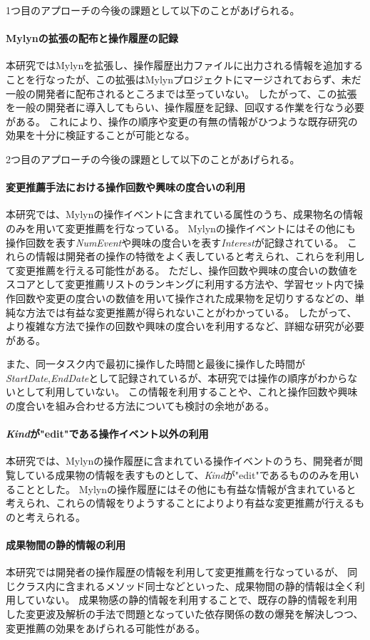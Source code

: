 \documentclass[a4paper]{jsbook}
\begin{document}
1つ目のアプローチの今後の課題として以下のことがあげられる。
\paragraph{Mylynの拡張の配布と操作履歴の記録}
本研究ではMylynを拡張し、操作履歴出力ファイルに出力される情報を追加することを行なったが、この拡張はMylynプロジェクトにマージされておらず、未だ一般の開発者に配布されるところまでは至っていない。
したがって、この拡張を一般の開発者に導入してもらい、操作履歴を記録、回収する作業を行なう必要がある。
これにより、操作の順序や変更の有無の情報がひつような既存研究の効果を十分に検証することが可能となる。

2つ目のアプローチの今後の課題として以下のことがあげられる。
\paragraph{変更推薦手法における操作回数や興味の度合いの利用}
本研究では、Mylynの操作イベントに含まれている属性のうち、成果物名の情報のみを用いて変更推薦を行なっている。
Mylynの操作イベントにはその他にも操作回数を表す{\it NumEvent}や興味の度合いを表す{\it Interest}が記録されている。
これらの情報は開発者の操作の特徴をよく表していると考えられ、これらを利用して変更推薦を行える可能性がある。
ただし、操作回数や興味の度合いの数値をスコアとして変更推薦リストのランキングに利用する方法や、学習セット内で操作回数や変更の度合いの数値を用いて操作された成果物を足切りするなどの、単純な方法では有益な変更推薦が得られないことがわかっている。
したがって、より複雑な方法で操作の回数や興味の度合いを利用するなど、詳細な研究が必要がある。

また、同一タスク内で最初に操作した時間と最後に操作した時間が{\it StartDate},{\it EndDate}として記録されているが、本研究では操作の順序がわからないとして利用していない。
この情報を利用することや、これと操作回数や興味の度合いを組み合わせる方法についても検討の余地がある。
\paragraph{{\it Kind}が"edit"である操作イベント以外の利用}
本研究では、Mylynの操作履歴に含まれている操作イベントのうち、開発者が閲覧している成果物の情報を表すものとして、{\it Kind}が"edit"であるもののみを用いることとした。
Mylynの操作履歴にはその他にも有益な情報が含まれていると考えられ、これらの情報をりようすることによりより有益な変更推薦が行えるものと考えられる。
\paragraph{成果物間の静的情報の利用}
本研究では開発者の操作履歴の情報を利用して変更推薦を行なっているが、
同じクラス内に含まれるメソッド同士などといった、成果物間の静的情報は全く利用していない。
成果物感の静的情報を利用することで、既存の静的情報を利用した変更波及解析の手法で問題となっていた依存関係の数の爆発を解決しつつ、変更推薦の効果をあげられる可能性がある。
\end{document}
